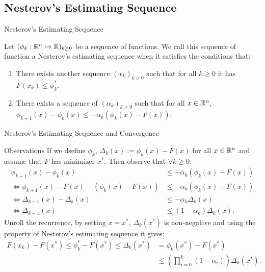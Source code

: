 \documentclass[11pt]{beamer}
\begin{document}
    \subsection{Nesterov's Estimating Sequence}
        \begin{frame}{Nesterov's Estimating Sequence}            
            \begin{definition}\label{def:nes-est-seq}
                Let $(\phi_k : \mathbb R^n \mapsto \mathbb R)_{k \ge 0}$ be a sequence of functions. 
                We call this sequence of function a Nesterov's estimating sequence when it satisfies the conditions that: 
                \begin{enumerate}
                    \item There exists another sequence $(x_k)_{k \ge 0}$ such that for all $k \ge 0$ it has $F(x_k) \le \phi_k^*$. 
                    \item There exists a sequence of $(\alpha_k)_{k \ge 0}$ such that for all $x \in \mathbb R^n$, $\phi_{k + 1}(x) - \phi_k(x) \le - \alpha_k(\phi_k(x) - F(x))$. 
                \end{enumerate}
            \end{definition}
        \end{frame}
        \begin{frame}{Nesterov's Estimating Sequence and Convergence}
            \begin{block}{Observations}
                {\small
                If we dsefine $\phi_k$, $\Delta_k(x) := \phi_k (x) - F(x)$ for all $x \in \mathbb R^n$ and assume that $F$ has minimizer $x^*$. 
                Then observe that $\forall k \ge 0$:  
                \begin{align*}
                    \phi_{k + 1}(x) - \phi_k(x) 
                    &\le - \alpha_k (\phi_k(x) - F(x))
                    \\
                    \iff 
                    \phi_{k + 1}(x) - F(x) - (\phi_k(x) - F(x))
                    &\le 
                    -\alpha_k(\phi_k(x) - F(x))
                    \\
                    \iff
                    \Delta_{k + 1}(x) - \Delta_k(x) &\le
                    - \alpha_k\Delta_k(x)
                    \\
                    \iff 
                    \Delta_{k + 1}(x) 
                    &\le 
                    (1 - \alpha_k)\Delta_k(x). 
                \end{align*}
                Unroll the recurrence, by setting $x = x^*$, $\Delta_k(x^*)$ is non-negative and using the property of Nesterov's estimating sequence it gives: 
                \begin{align*}
                    F(x_k) - F(x^*) \le \phi_k^* - F(x^*) \le \Delta_k(x^*) 
                    &= \phi_k(x^*) - F(x^*) 
                    \\
                    &\le \left(\prod_{i = 0}^k(1 - \alpha_i)\right)\Delta_0(x^*).
                \end{align*}
                }
            \end{block}
        \end{frame}
\end{document}
